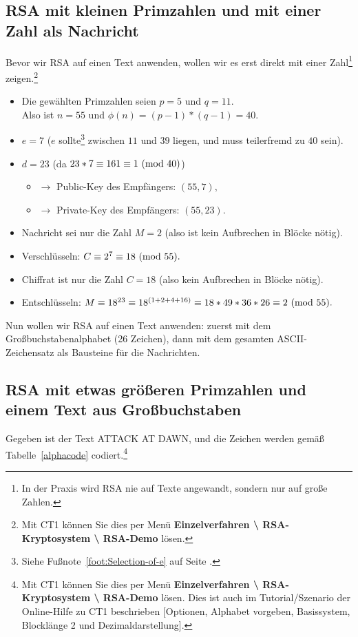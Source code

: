 \begin{refsegment}
\subsection{RSA mit kleinen Primzahlen und mit einer Zahl als Nachricht}
Bevor wir RSA auf einen Text anwenden, wollen wir es erst direkt mit einer
Zahl\footnote{%
   In der Praxis wird RSA nie auf Texte angewandt, sondern nur auf große Zahlen.
}
zeigen.\footnote{%
   Mit CT1 können Sie dies per Menü \textbf{Einzelverfahren
   \textbackslash{} RSA-Kryptosystem \textbackslash{} RSA-Demo} lösen.
}
\begin{itemize}
  \item[\textbf{1.}] Die gewählten Primzahlen seien $p=5$ und $q=11$.\\
                Also ist $n=55$ und $\phi(n) = (p-1)*(q-1)=40$.
  \item[\textbf{2.}] $e = 7$ ($e$ sollte\footnote{%
                Siehe Fußnote~\ref{foot:Selection-of-e} auf Seite
                \pageref{foot:Selection-of-e}.} zwischen $11$ und $39$ liegen,
                und muss teilerfremd
                zu $40$ sein).
  \item[\textbf{3.}] $d = 23$ (da $23*7 \equiv 161 \equiv 1{\rm ~(mod~}40)$)
  \begin{itemize}
     \item[] $\rightarrow$ Public-Key des Empfängers: $(55, 7),$
     \item[] $\rightarrow$ Private-Key des Empfängers: $(55, 23).$
  \end{itemize}
  \item[\textbf{4.}] Nachricht sei nur die Zahl $M = 2$ (also ist kein
                Aufbrechen in Blöcke nötig).
  \item[\textbf{5.}] Verschlüsseln: $C \equiv 2^7 \equiv 18 {\rm ~(mod~}55).$
  \item[\textbf{6.}] Chiffrat ist nur die Zahl $C = 18$ (also kein Aufbrechen
                in Blöcke nötig).
  \item[\textbf{7.}] Entschlüsseln: $M \equiv 18^{23} \equiv 18^{(1+2+4+16)} \equiv 18*49*36*26 \equiv 2 {\rm ~(mod~}55).$
\end{itemize}
Nun wollen wir RSA auf einen Text anwenden: zuerst mit dem
Großbuchstabenalphabet (26 Zeichen), dann mit dem gesamten
ASCII-Zeichensatz als Bausteine für die Nachrichten.


\subsection{RSA mit etwas größeren Primzahlen und einem Text aus Großbuchstaben}\label{rsaex2}
Gegeben ist der Text \glqq ATTACK AT DAWN\grqq, und die Zeichen werden gemäß
Tabelle~\ref{alphacode} codiert.\footnote{%
Mit CT1 können Sie dies per Menü
\textbf{Einzelverfahren \textbackslash{} RSA-Kryptosystem \textbackslash{} RSA-Demo} lösen.
Dies ist auch im Tutorial/Szenario der Online-Hilfe zu CT1 beschrieben [Optionen,
Alphabet vorgeben, Basissystem, Blocklänge 2 und Dezimaldarstellung].
}


\end{refsegment}
